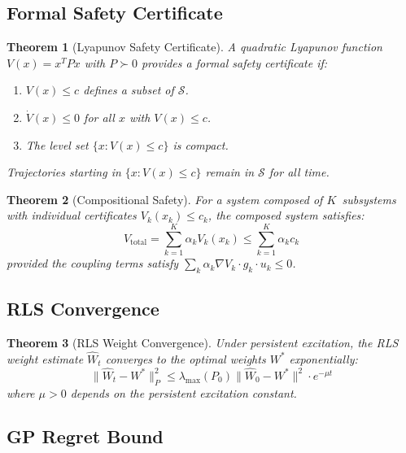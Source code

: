 \documentclass[11pt,twocolumn]{article}
\newtheorem{theorem}{Theorem}[section]
\theoremstyle{definition}
\newcommand{\cS}{\mathcal{S}}
\begin{document}
\subsection{Formal Safety Certificate}

\begin{theorem}[Lyapunov Safety Certificate]
\label{thm:lyapunov_cert}
A quadratic Lyapunov function $V(x) = x^T P x$ with $P \succ 0$ provides a formal safety certificate if:
\begin{enumerate}[leftmargin=*]
    \item $V(x) \leq c$ defines a subset of $\cS$.
    \item $\dot{V}(x) \leq 0$ for all $x$ with $V(x) \leq c$.
    \item The level set $\{x : V(x) \leq c\}$ is compact.
\end{enumerate}
Trajectories starting in $\{x : V(x) \leq c\}$ remain in $\cS$ for all time.
\end{theorem}

\begin{theorem}[Compositional Safety]
\label{thm:compositional}
For a system composed of $K$~subsystems with individual certificates $V_k(x_k) \leq c_k$, the composed system satisfies:
\begin{equation}
V_{\text{total}} = \sum_{k=1}^K \alpha_k V_k(x_k) \leq \sum_{k=1}^K \alpha_k c_k
\end{equation}
provided the coupling terms satisfy $\sum_k \alpha_k \nabla V_k \cdot g_k \cdot u_k \leq 0$.
\end{theorem}

\subsection{RLS Convergence}

\begin{theorem}[RLS Weight Convergence]
\label{thm:rls_convergence}
Under persistent excitation, the RLS weight estimate $\hat{W}_t$ converges to the optimal weights $W^*$ exponentially:
\begin{equation}
\|\hat{W}_t - W^*\|_P^2 \leq \lambda_{\max}(P_0) \|\hat{W}_0 - W^*\|^2 \cdot e^{-\mu t}
\end{equation}
where $\mu > 0$ depends on the persistent excitation constant.
\end{theorem}

\subsection{GP Regret Bound}
\end{document}
